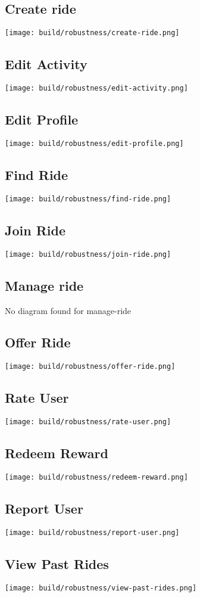 \documentclass[11pt]{article}
\begin{document}
\subsection{Create ride}
\texttt{[image: build/robustness/create-ride.png]}
\subsection{Edit Activity}
\texttt{[image: build/robustness/edit-activity.png]}
\subsection{Edit Profile}
\texttt{[image: build/robustness/edit-profile.png]}
\subsection{Find Ride}
\texttt{[image: build/robustness/find-ride.png]}
\subsection{Join Ride}
\texttt{[image: build/robustness/join-ride.png]}
\subsection{Manage ride}
No diagram found for manage-ride
\subsection{Offer Ride}
\texttt{[image: build/robustness/offer-ride.png]}
\subsection{Rate User}
\texttt{[image: build/robustness/rate-user.png]}
\subsection{Redeem Reward}
\texttt{[image: build/robustness/redeem-reward.png]}
\subsection{Report User}
\texttt{[image: build/robustness/report-user.png]}
\subsection{View Past Rides}
\texttt{[image: build/robustness/view-past-rides.png]}
\end{document}
